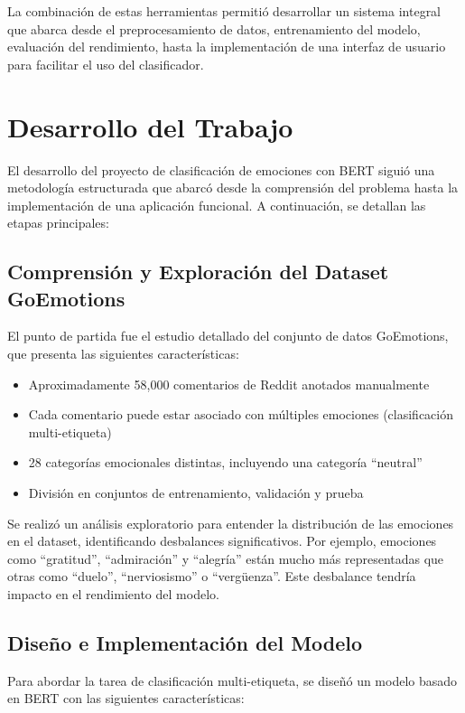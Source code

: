 \documentclass[12pt,a4paper]{report}
\begin{document}
La combinación de estas herramientas permitió desarrollar un sistema integral que abarca desde el preprocesamiento de datos, entrenamiento del modelo, evaluación del rendimiento, hasta la implementación de una interfaz de usuario para facilitar el uso del clasificador.

\section{Desarrollo del Trabajo}

El desarrollo del proyecto de clasificación de emociones con BERT siguió una metodología estructurada que abarcó desde la comprensión del problema hasta la implementación de una aplicación funcional. A continuación, se detallan las etapas principales:

\subsection{Comprensión y Exploración del Dataset GoEmotions}

El punto de partida fue el estudio detallado del conjunto de datos GoEmotions, que presenta las siguientes características:
\begin{itemize}
  \item Aproximadamente 58,000 comentarios de Reddit anotados manualmente
  \item Cada comentario puede estar asociado con múltiples emociones (clasificación multi-etiqueta)
  \item 28 categorías emocionales distintas, incluyendo una categoría ``neutral''
  \item División en conjuntos de entrenamiento, validación y prueba
\end{itemize}

Se realizó un análisis exploratorio para entender la distribución de las emociones en el dataset, identificando desbalances significativos. Por ejemplo, emociones como ``gratitud'', ``admiración'' y ``alegría'' están mucho más representadas que otras como ``duelo'', ``nerviosismo'' o ``vergüenza''. Este desbalance tendría impacto en el rendimiento del modelo.

\subsection{Diseño e Implementación del Modelo}

Para abordar la tarea de clasificación multi-etiqueta, se diseñó un modelo basado en BERT con las siguientes características:
\end{document}

